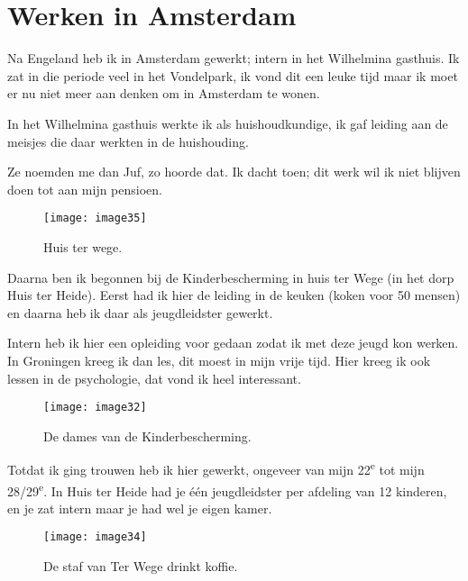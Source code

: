 \chapter*{\label{ref-007}Werken in Amsterdam}

Na Engeland heb ik in Amsterdam gewerkt; intern in het Wilhelmina gasthuis. Ik zat in die periode veel in het Vondelpark, ik vond dit een leuke tijd maar ik moet er nu niet meer aan denken om in Amsterdam te wonen. 

In het Wilhelmina gasthuis werkte ik als huishoudkundige, ik gaf leiding aan de meisjes die daar werkten in de huishouding. 

Ze noemden me dan Juf, zo hoorde dat. Ik dacht toen; dit werk wil ik niet blijven doen tot aan mijn pensioen.

\begin{figure}[h!]
    \texttt{[image: image35]}
    \caption{Huis ter wege.}
\end{figure}

Daarna ben ik begonnen bij de Kinderbescherming in huis ter Wege (in het dorp Huis ter Heide). Eerst had ik hier de leiding in de keuken (koken voor 50 mensen) en daarna heb ik daar als jeugdleidster gewerkt. 


Intern heb ik hier een opleiding voor gedaan zodat ik met deze jeugd kon werken. In Groningen kreeg ik dan les, dit moest in mijn vrije tijd. Hier kreeg ik ook lessen in de psychologie, dat vond ik heel interessant. 

\begin{figure}[h]
    \texttt{[image: image32]}
    \caption{De dames van de Kinderbescherming.}
\end{figure}

Totdat ik ging trouwen heb ik hier gewerkt, ongeveer van mijn 22\textsuperscript{e} tot mijn 28/29\textsuperscript{e}. In Huis ter Heide had je \'{e}\'{e}n jeugdleidster per afdeling van 12 kinderen, en je zat intern maar je had wel je eigen kamer.

\begin{figure}[h]
    \texttt{[image: image34]}
    \caption{De staf van Ter Wege drinkt koffie.}
\end{figure}

